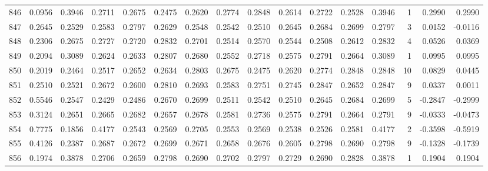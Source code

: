 \begin{tabular}{lrrrrrrrrrrrrrrr}
846 &      0.0956 &  0.3946 &  0.2711 &  0.2675 &  0.2475 &  0.2620 &  0.2774 &  0.2848 &  0.2614 &  0.2722 &   0.2528 &     0.3946 &      1 &                    0.2990 &                     0.2990 \\
847 &      0.2645 &  0.2529 &  0.2583 &  0.2797 &  0.2629 &  0.2548 &  0.2542 &  0.2510 &  0.2645 &  0.2684 &   0.2699 &     0.2797 &      3 &                    0.0152 &                    -0.0116 \\
848 &      0.2306 &  0.2675 &  0.2727 &  0.2720 &  0.2832 &  0.2701 &  0.2514 &  0.2570 &  0.2544 &  0.2508 &   0.2612 &     0.2832 &      4 &                    0.0526 &                     0.0369 \\
849 &      0.2094 &  0.3089 &  0.2624 &  0.2633 &  0.2807 &  0.2680 &  0.2552 &  0.2718 &  0.2575 &  0.2791 &   0.2664 &     0.3089 &      1 &                    0.0995 &                     0.0995 \\
850 &      0.2019 &  0.2464 &  0.2517 &  0.2652 &  0.2634 &  0.2803 &  0.2675 &  0.2475 &  0.2620 &  0.2774 &   0.2848 &     0.2848 &     10 &                    0.0829 &                     0.0445 \\
851 &      0.2510 &  0.2521 &  0.2672 &  0.2600 &  0.2810 &  0.2693 &  0.2583 &  0.2751 &  0.2745 &  0.2847 &   0.2652 &     0.2847 &      9 &                    0.0337 &                     0.0011 \\
852 &      0.5546 &  0.2547 &  0.2429 &  0.2486 &  0.2670 &  0.2699 &  0.2511 &  0.2542 &  0.2510 &  0.2645 &   0.2684 &     0.2699 &      5 &                   -0.2847 &                    -0.2999 \\
853 &      0.3124 &  0.2651 &  0.2665 &  0.2682 &  0.2657 &  0.2678 &  0.2581 &  0.2736 &  0.2575 &  0.2791 &   0.2664 &     0.2791 &      9 &                   -0.0333 &                    -0.0473 \\
854 &      0.7775 &  0.1856 &  0.4177 &  0.2543 &  0.2569 &  0.2705 &  0.2553 &  0.2569 &  0.2538 &  0.2526 &   0.2581 &     0.4177 &      2 &                   -0.3598 &                    -0.5919 \\
855 &      0.4126 &  0.2387 &  0.2687 &  0.2672 &  0.2699 &  0.2671 &  0.2658 &  0.2676 &  0.2605 &  0.2798 &   0.2690 &     0.2798 &      9 &                   -0.1328 &                    -0.1739 \\
856 &      0.1974 &  0.3878 &  0.2706 &  0.2659 &  0.2798 &  0.2690 &  0.2702 &  0.2797 &  0.2729 &  0.2690 &   0.2828 &     0.3878 &      1 &                    0.1904 &                     0.1904 \\

\end{tabular}
